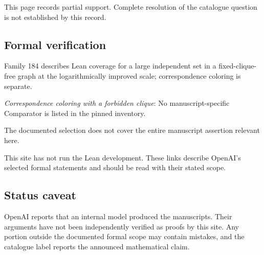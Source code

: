 \documentclass[11pt]{article}
\begin{document}
This page records partial support. Complete resolution of the catalogue question is not established by this record.

\subsection{Formal verification}
Family 184 describes Lean coverage for a large independent set in a fixed-clique-free graph at the logarithmically improved scale; correspondence coloring is separate.

\textit{Correspondence coloring with a forbidden clique}: No manuscript-specific Comparator is listed in the pinned inventory.

The documented selection does not cover the entire manuscript assertion relevant here.

This site has not run the Lean development. These links describe OpenAI’s selected formal statements and should be read with their stated scope.

\subsection{Status caveat}
OpenAI reports that an internal model produced the manuscripts. Their arguments have not been independently verified as proofs by this site. Any portion outside the documented formal scope may contain mistakes, and the catalogue label reports the announced mathematical claim.
\end{document}

